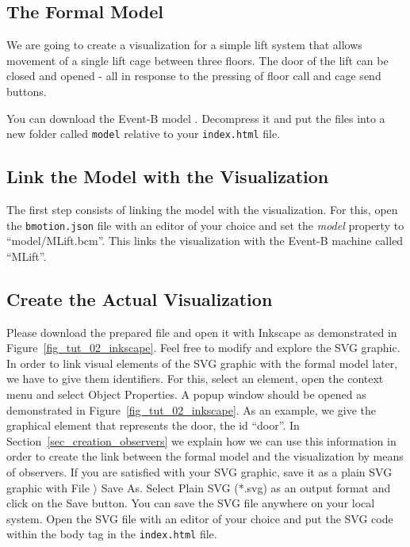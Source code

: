 \subsection{The Formal Model}

We are going to create a visualization	for a simple lift system that allows movement of a single lift cage between three floors.
The door of the lift can be closed and opened - all in response to the pressing of floor call and cage send buttons.

You can download the Event-B model .
Decompress it and put the files into a new folder called \texttt{model} relative to your \texttt{index.html} file.

\subsection{Link the Model with the Visualization}

The first step consists of linking the model with the visualization.
For this, open the \texttt{bmotion.json} file with an editor of your choice and set the \textit{model} property to ``model/MLift.bcm''.
This links the visualization with the Event-B machine called ``MLift''.

\subsection{Create the Actual Visualization}

Please download the prepared  file and open it with Inkscape as demonstrated in Figure~\ref{fig_tut_02_inkscape}.
Feel free to modify and explore the SVG graphic.
In order to link visual elements of the SVG graphic with the formal model later, we have to give them identifiers. 
For this, select an element, open the context menu and select \textsf{Object Properties}.
A popup window should be opened as demonstrated in Figure~\ref{fig_tut_02_inkscape}.
As an example, we give the graphical element that represents the door, the id ``door''.
In Section~\ref{sec_creation_observers} we explain how we can use this information in order to create the link between the formal model and the visualization by means of observers.
If you are satisfied with your SVG graphic, save it as a plain SVG graphic with \textsf{File $\rangle$ Save As}.
Select \textsf{Plain SVG (*.svg)} as an output format and click on the \textsf{Save} button.
You can save the SVG file anywhere on your local system. 
Open the SVG file with an editor of your choice and put the SVG code within the body tag in the \texttt{index.html} file.

